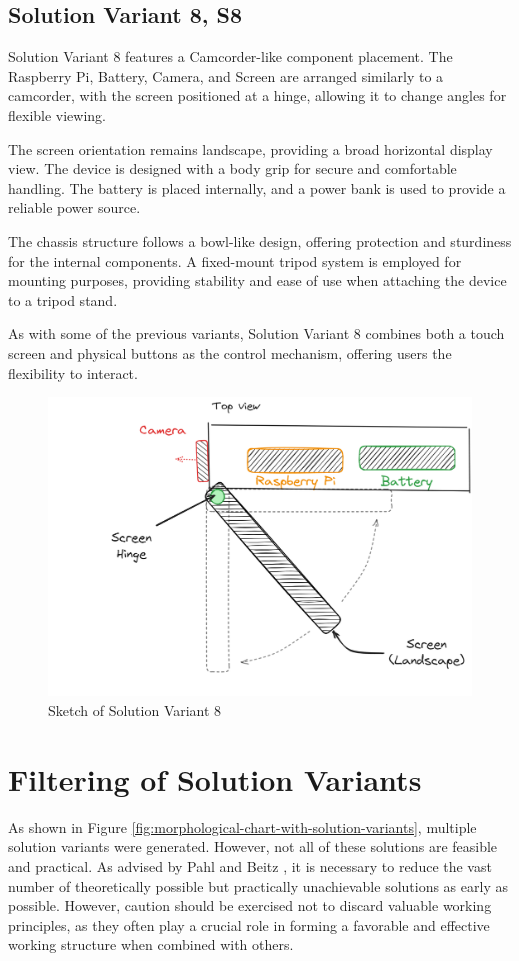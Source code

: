 \subsection{Solution Variant 8, S8}
Solution Variant 8 features a Camcorder-like component placement. The Raspberry Pi, Battery, Camera, and Screen are arranged similarly to a camcorder, with the screen positioned at a hinge, allowing it to change angles for flexible viewing.

The screen orientation remains landscape, providing a broad horizontal display view. The device is designed with a body grip for secure and comfortable handling. The battery is placed internally, and a power bank is used to provide a reliable power source.

The chassis structure follows a bowl-like design, offering protection and sturdiness for the internal components. A fixed-mount tripod system is employed for mounting purposes, providing stability and ease of use when attaching the device to a tripod stand.

As with some of the previous variants, Solution Variant 8 combines both a touch screen and physical buttons as the control mechanism, offering users the flexibility to interact.

\begin{figure}[H]
    \centering
    \includegraphics[width=0.5\linewidth]{texs/Part1/chapter3/image/v8.png}
    \caption{Sketch of Solution Variant 8}
    \label{fig:sketch-solution-variant-8}
\end{figure}

\section{Filtering of Solution Variants}
\label{sec:filtering-of-solution-variants}
As shown in Figure \ref{fig:morphological-chart-with-solution-variants}, multiple solution variants were generated. However, not all of these solutions are feasible and practical. As advised by Pahl and Beitz \cite[106-107]{Pahl2007}, it is necessary to reduce the vast number of theoretically possible but practically unachievable solutions as early as possible. However, caution should be exercised not to discard valuable working principles, as they often play a crucial role in forming a favorable and effective working structure when combined with others.

